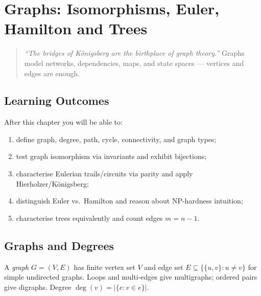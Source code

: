 \chapter[Graphs]{Graphs: Isomorphisms, Euler, Hamilton and Trees}
\label{ch:graphs}

\begin{quote}
\emph{``The bridges of K\"onigsberg are the birthplace of graph theory.''} Graphs model networks, dependencies, maps, and state spaces --- vertices and edges are enough.
\end{quote}

\noindent{}
\vspace{0.4em}

\section*{Learning Outcomes}
After this chapter you will be able to:
\begin{enumerate}[label=(L\arabic*)]
    \item define graph, degree, path, cycle, connectivity, and graph types;
    \item test graph isomorphism via invariants and exhibit bijections;
    \item characterise Eulerian trails/circuits via parity and apply Hierholzer/K\"onigsberg;
    \item distinguish Euler vs.\ Hamilton and reason about NP-hardness intuition;
    \item characterise trees equivalently and count edges $m=n-1$.
\end{enumerate}

\section{Graphs and Degrees}
\label{sec:graph-def}
A \emph{graph} $G=(V,E)$ has finite vertex set $V$ and edge set $E\subseteq\{\{u,v\}:u\neq v\}$ for simple undirected graphs. Loops and multi-edges give multigraphs; ordered pairs give digraphs. Degree $\deg(v)=|\{e:v\in e\}|$.

